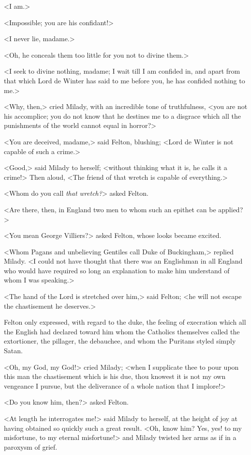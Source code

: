 <I am.> 

<Impossible; you are his confidant!> 

<I never lie, madame.> 

<Oh, he conceals them too little for you not to divine them.> 

<I seek to divine nothing, madame; I wait till I am confided in, and apart from that which Lord de Winter has said to me before you, he has confided nothing to me.> 

<Why, then,> cried Milady, with an incredible tone of truthfulness, <you are not his accomplice; you do not know that he destines me to a disgrace which all the punishments of the world cannot equal in horror?> 

<You are deceived, madame,> said Felton, blushing; <Lord de Winter is not capable of such a crime.> 

<Good,> said Milady to herself; <without thinking what it is, he calls it a crime!> Then aloud, <The friend of that wretch is capable of everything.> 

<Whom do you call \textit{that wretch?}> asked Felton. 

<Are there, then, in England two men to whom such an epithet can be applied?> 

<You mean George Villiers?> asked Felton, whose looks became excited. 

<Whom Pagans and unbelieving Gentiles call Duke of Buckingham,> replied Milady. <I could not have thought that there was an Englishman in all England who would have required so long an explanation to make him understand of whom I was speaking.> 

<The hand of the Lord is stretched over him,> said Felton; <he will not escape the chastisement he deserves.> 

Felton only expressed, with regard to the duke, the feeling of execration which all the English had declared toward him whom the Catholics themselves called the extortioner, the pillager, the debauchee, and whom the Puritans styled simply Satan. 

<Oh, my God, my God!> cried Milady; <when I supplicate thee to pour upon this man the chastisement which is his due, thou knowest it is not my own vengeance I pursue, but the deliverance of a whole nation that I implore!> 

<Do you know him, then?> asked Felton. 

<At length he interrogates me!> said Milady to herself, at the height of joy at having obtained so quickly such a great result. <Oh, know him? Yes, yes! to my misfortune, to my eternal misfortune!> and Milady twisted her arms as if in a paroxysm of grief. 

